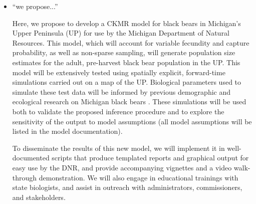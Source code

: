 \documentclass[12pt]{article}
\newcommand{\gb}[1]{{\color{blue}{#1}}}
\begin{document}
\begin{itemize}
\item ``we propose...'' 

Here, we propose to develop a \gb{spatial} CKMR model 
for black bears in Michigan's Upper Peninsula (UP) 
for use by the Michigan Department of Natural Resources.
This model, which will account for 
variable fecundity and capture probability, 
as well as non-sparse sampling, 
will generate population size estimates 
for the adult, pre-harvest black bear population in the UP. 
\gb{We will extend existing CKMR models 
to incorporate geography; 
in addition to generating estimates of total population size, 
this spatial model will also generate maps of estimated 
population density, 
and has the potential to shed light 
on other demographic parameters as well.}
This model will be extensively tested using spatially explicit,  
forward-time simulations carried out on a map of the UP. 
\gb{peter add text here.}
Biological parameters used to simulate these test data 
will be informed by previous demographic and ecological 
research on Michigan black bears \citep{moore2014application}.
These simulations will be used both to 
validate the proposed inference procedure 
and to explore the sensitivity of the output to model assumptions 
(all model assumptions will be listed in the model documentation).

To disseminate the results of this new model, 
we will implement it in well-documented scripts 
that produce templated reports and graphical output
for easy use by the DNR, 
and provide accompanying vignettes 
and a video walk-through demonstration. 
We will also engage in educational trainings with state biologists, 
and assist in outreach with 
administrators, commissioners, and stakeholders.


\end{itemize}
\end{document}
